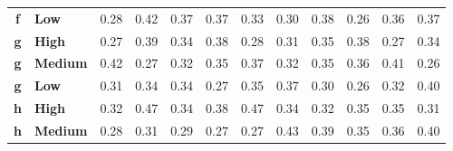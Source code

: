 \documentclass[mathematics,article,submit,moreauthors,pdftex]{mdpi}
\begin{document}
\begin{table}[H]
\begin{tabular}{@{}clrrrrrrrrrr@{}}
\textbf{f}     & \textbf{Low}       & 0.28                               & 0.42                               & 0.37                               & 0.37                               & 0.33                               & 0.30                               & 0.38                               & 0.26                               & 0.36                               & 0.37                                \\
\rowcolor[HTML]{D9D9D9} 
\textbf{g}     & \textbf{High}      & 0.27                               & 0.39                               & 0.34                               & 0.38                               & 0.28                               & 0.31                               & 0.35                               & 0.38                               & 0.27                               & 0.34                                \\
\rowcolor[HTML]{D9D9D9} 
\textbf{g}     & \textbf{Medium}    & 0.42                               & 0.27                               & 0.32                               & 0.35                               & 0.37                               & 0.32                               & 0.35                               & 0.36                               & 0.41                               & 0.26                                \\
\rowcolor[HTML]{D9D9D9} 
\textbf{g}     & \textbf{Low}       & 0.31                               & 0.34                               & 0.34                               & 0.27                               & 0.35                               & 0.37                               & 0.30                               & 0.26                               & 0.32                               & 0.40                                \\
\textbf{h}     & \textbf{High}      & 0.32                               & 0.47                               & 0.34                               & 0.38                               & 0.47                               & 0.34                               & 0.32                               & 0.35                               & 0.35                               & 0.31                                \\
\textbf{h}     & \textbf{Medium}    & 0.28                               & 0.31                               & 0.29                               & 0.27                               & 0.27                               & 0.43                               & 0.39                               & 0.35                               & 0.36                               & 0.40                                \\

\end{tabular}
\end{table}
\end{document}
